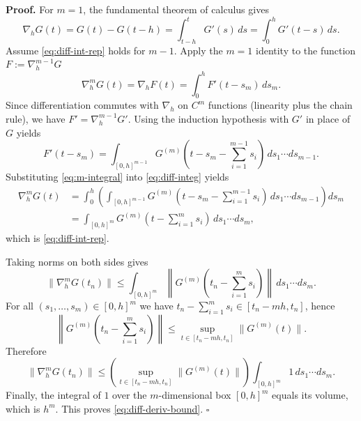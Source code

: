 \documentclass[12pt]{article}
\newenvironment{pf}{\noindent\textbf{Proof.}}{\hfill$\square$}
\begin{document}
\begin{pf}
For $m=1$, the fundamental theorem of calculus gives
\begin{equation*}
\nabla_h G(t)=G(t)-G(t-h)=\int_{t-h}^{t} G'(s)\,ds=\int_{0}^{h} G'(t-s)\,ds.
\end{equation*}
Assume \eqref{eq:diff-int-rep} holds for $m-1$. Apply the $m=1$ identity to the function
$F:=\nabla_h^{m-1}G$
\begin{equation}
\label{eq:diff-integ}
\nabla_h^{m}G(t)=\nabla_h F(t)=\int_{0}^{h} F'(t-s_m)\,ds_m.
\end{equation}
Since differentiation commutes with $\nabla_h$ on $C^{m}$ functions (linearity plus the chain rule),
we have $F'=\nabla_h^{m-1}G'$. Using the induction hypothesis with $G'$ in place of $G$ yields
\begin{equation}
\label{eq:m-integral}
F'(t-s_m)
= \int_{[0,h]^{m-1}} G^{(m)}\!\left(t-s_m-\sum_{i=1}^{m-1}s_i\right)\,ds_1\cdots ds_{m-1}.
\end{equation}
Substituting \eqref{eq:m-integral} into \eqref{eq:diff-integ} yields
\begin{align*}
\nabla_h^{m}G(t)
&=\int_{0}^{h}\left(\int_{[0,h]^{m-1}}
G^{(m)}\!\left(t-s_m-\sum_{i=1}^{m-1}s_i\right)\,ds_1\cdots ds_{m-1}\right)ds_m\\
&=\int_{[0,h]^m} G^{(m)}\!\left(t-\sum_{i=1}^{m}s_i\right)\,ds_1\cdots ds_m,
\end{align*}
which is \eqref{eq:diff-int-rep}.

Taking norms on both sides gives
\begin{equation*}
\|\nabla_h^{m}G(t_n)\|
\le \int_{[0,h]^m}\left\|G^{(m)}\!\left(t_n-\sum_{i=1}^{m}s_i\right)\right\|\,ds_1\cdots ds_m.
\end{equation*}
For all $(s_1,\dots,s_m)\in[0,h]^m$ we have
$t_n-\sum_{i=1}^{m}s_i \in [t_n-mh,t_n]$, hence
\begin{equation*}
\left\|G^{(m)}\!\left(t_n-\sum_{i=1}^{m}s_i\right)\right\|
\le \sup_{t\in[t_n-mh,t_n]}\|G^{(m)}(t)\|.
\end{equation*}
Therefore
\begin{equation*}
\|\nabla_h^{m}G(t_n)\|
\le \left(\sup_{t\in[t_n-mh,t_n]}\|G^{(m)}(t)\|\right)
\int_{[0,h]^m} 1\,ds_1\cdots ds_m.
\end{equation*}
Finally, the integral of $1$ over the $m$-dimensional box $[0,h]^m$ equals its volume,
which is $h^m$. This proves \eqref{eq:diff-deriv-bound}.
\end{pf}
\end{document}
